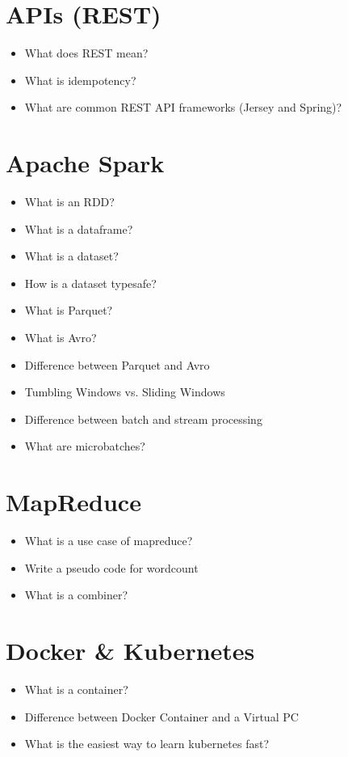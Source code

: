 \documentclass[12pt, numbers=noenddot]{scrreprt} %
\begin{document}
\section*{APIs (REST)}

\begin{itemize}
\item What does REST mean?
\item What is idempotency?
\item What are common REST API frameworks (Jersey and Spring)?
\end{itemize}

\section*{Apache Spark}

\begin{itemize}
\item What is an RDD?
\item What is a dataframe?
\item What is a dataset?
\item How is a dataset typesafe?
\item What is Parquet?
\item What is Avro?
\item Difference between Parquet and Avro
\item Tumbling Windows vs. Sliding Windows
\item Difference between batch and stream processing
\item What are microbatches?
\end{itemize}

\section*{MapReduce}

\begin{itemize}
\item What is a use case of mapreduce?
\item Write a pseudo code for wordcount
\item What is a combiner?
\end{itemize}

\section*{Docker \& Kubernetes}

\begin{itemize}
\item What is a container?
\item Difference between Docker Container and a Virtual PC
\item What is the easiest way to learn kubernetes fast?
\end{itemize}
\end{document}
